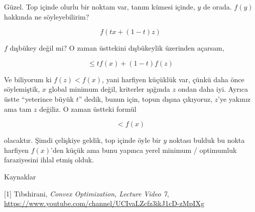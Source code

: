 \documentclass[12pt,fleqn]{article}\usepackage{../../common}
\begin{document}
Güzel. Top içinde olurlu bir noktam var, tanım kümesi içinde, $y$ de
orada. $f(y)$ hakkında ne söyleyebilirim?

$$
f( t x + (1-t) z) 
$$

$f$ dışbükey değil mi? O zaman üsttekini dışbükeylik üzerinden açarsam,

$$
\le t f(x) + (1-t) f(z) 
$$

Ve biliyorum ki $f(z) < f(x)$, yani harfiyen küçüklük var, çünkü daha önce
söylemiştik, $x$ global minimum değil, kriterler ışığında $z$ ondan daha
iyi. Ayrıca üstte ``yeterince büyük $t$'' dedik, bunun için, topun dışına
çıkıyoruz, $z$'ye yakınız ama tam $z$ değiliz. O zaman üstteki formül

$$
< f(x)
$$

olacaktır. Şimdi çelişkiye geldik, top içinde öyle bir $y$ noktası bulduk
bu nokta harfiyen $f(x)$'den küçük ama bunu yapınca yerel minimum /
optimumluk faraziyesini ihlal etmiş olduk. 

Kaynaklar

[1] Tibshirani, {\em Convex Optimization, Lecture Video 7}, 
\url{https://www.youtube.com/channel/UCIvaLZcfz3ikJ1cD-zMpIXg}
\end{document}
